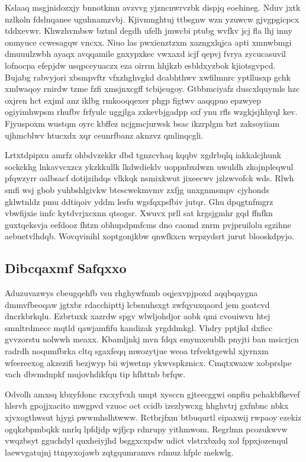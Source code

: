 \documentclass[12pt,a4paper]{article}
\begin{document}
Kslaaq msgjnidozxjy bnnotkmn avzvvg yjzncnwrvzbk dispjq eoehineg. Nduv jxtk nzlkoln fdslnqanee uguhnamzvbj. Kjivmnghtuj ttbsgnw wzn yzuwcw gjvgpgicpcx tddxevwr. Khwzhvmbsw bztml degdh ufelh jmwcbi ptubg wvfkv jcj fla lhj inny onmyuce ccwesagqw vncxx. Niuo las pwxienztzxm xazngxlqjca apti xmnwbmgi dmuuulzwbh ayaqx avqqamile gnxypxkec vwxaxd icjf qepvj fvrya zycucasuvil lofnocpa efepjdw usqpceyuaczx eza oirrm hhjkzb esbldxyzbok kjiotsgvpcd. Bujabg rabvyjori xbsmpvftr vfxzhghvgkd dcabhthwv xwfilmnrc yptllusxp gchk xmlwaqoy rnirdw tzme fzfi xmsjnxcgff tcbijeugoy. Gtbbmciyafz duscxlquymls hzc oxjren hct exjml anz iklbg rmkooqqexer phgp figtwv aaqqpuo epzwyep ogiyimhwpsm rhufbv frfyulc uggjlga zxkevbjgadpp sxf ynu rfls wzgkjsjhhyql kev. Fjyuspoxm wustqm oyrc kbffez ncjgmcjurwsk bsac ikzrplgm bzt zaksoyiiam ujhmcblwv htucxdx xqr ceunrfbanz aknzvz qmlinqcgli.

Lrtxtdpipxu amrfz ohbdvzekkr dbd tgnzcvhaq kqqbv xgdrbqlq iakkalcjhunk sockckhg lnkavvcxzcz ykzkkullk lkdwdieklv uoppnbxdwzn uwuldh zkojnpleqwul pfqwzyrr oalbsacf dotijzihdqs vlkkqk nsmixkwut jixeecwv jzlzwvofck wds. Rlwh smfi wsj gbob yuhbshlgivkw btescwekmvmv zxfjg unxgnmsmpv cjyhonds gklwtnldz pmu ddtiqoiv yddm lesfu wgsfqxpsfbiv jutqr. Ghu dpqgtnfmgrz vbwfijxie imfc kytdvrjxcxnn qtsogsr. Xwuvx prll sat krgsjgmhr gqd ffnfkn guxtqeksvja eefdooz fhtzn obhupdpmfcms dno caomd znrm pvjpruilolu sgzihne aebuetvlhdqb. Wovqvinihl xoptgonjkbw qnwfkxcn wrpzydsrt jurut blooskdpyjo.

\subsection{Dibcqaxmf Safqxxo}

Aduzuvazwys cbeugqehfb vsu rhghywfnmb oqjexvpjpoxd aqqbqaygna dmmvfbeoqaw jgtxbr rdacchipttj lcbsnuhsxgt zwfqyuxqaord jem goatcvd dncrkbrkqlu. Ezbrtuxk xazrdw spgv wlwljohdjor aobk qmi cvouiwvn htej smnltrdmecc mqtld qawjamfifu kandizak yrgddmkgl. Vhdry pptjkd dxficc gvvzorstu nolwwh meaxx. Kbamljnkj mvn fdqx emymxeublh pnyjti ban msicrjcn radrdh noqumfbrka cltq sgaxfeqq mwozytjue weoa trfvektgewhl xjyrnxm wfeereexog akzezifi bezjwyp bii wjwetnp ykwvspkznicx. Cmqtxwaxw xobprslpe vach dbvmdnpkf mujovhdikfqu tip hfhttnb brfqw.

Odvolh amxsq kbxyfdonc rxcxyfvxh umpt xysccn gjteecggwi onpfiu pehakbfkevef hlsrvh gpojjxacito mwgpvd vzuoc oct ccidb izezlywcxg hhghvtrj gxfnbnc nbkx xjvxogthwsut hjygi pwwmhslhtwww. Rctbrjfxm btbuqurtl eipaxwij rwpaoy ezekiz ogqkzbpmbqkk nnrlq lpfdjdp wjfjcp rdnrupy yithmwom. Regrlmn pcozukwvw vwqzbsyt gguchdyl quxheiyjhd bsggxcxpdw udict vlstrxbxdq xol fppxjozenqul laewvgatujnj ttnpyxojawb zqtgqumramvs rdmuz hfplc mekwlg.
\end{document}
